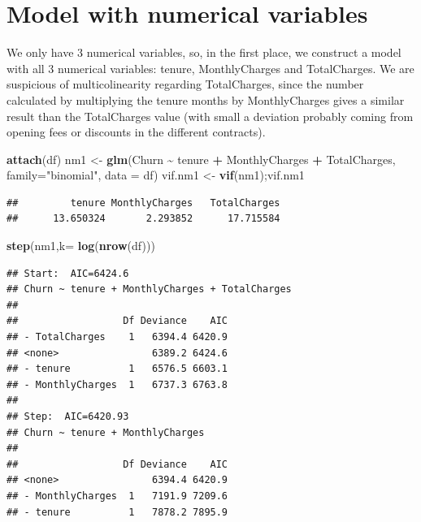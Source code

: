 \documentclass[
]{article}
\newenvironment{Shaded}{\begin{snugshade}}{\end{snugshade}}
\newcommand{\AttributeTok}[1]{\textcolor[rgb]{0.13,0.29,0.53}{#1}}
\newcommand{\FunctionTok}[1]{\textcolor[rgb]{0.13,0.29,0.53}{\textbf{#1}}}
\newcommand{\NormalTok}[1]{#1}
\newcommand{\OtherTok}[1]{\textcolor[rgb]{0.56,0.35,0.01}{#1}}
\newcommand{\SpecialCharTok}[1]{\textcolor[rgb]{0.81,0.36,0.00}{\textbf{#1}}}
\newcommand{\StringTok}[1]{\textcolor[rgb]{0.31,0.60,0.02}{#1}}
\begin{document}
\hypertarget{model-with-numerical-variables}{%
\section{Model with numerical
variables}\label{model-with-numerical-variables}}

We only have 3 numerical variables, so, in the first place, we construct
a model with all 3 numerical variables: tenure, MonthlyCharges and
TotalCharges. We are suspicious of multicolinearity regarding
TotalCharges, since the number calculated by multiplying the tenure
months by MonthlyCharges gives a similar result than the TotalCharges
value (with small a deviation probably coming from opening fees or
discounts in the different contracts).

\begin{Shaded}
\begin{Highlighting}[]
\FunctionTok{attach}\NormalTok{(df)}
\NormalTok{nm1 }\OtherTok{\textless{}{-}} \FunctionTok{glm}\NormalTok{(Churn }\SpecialCharTok{\textasciitilde{}}\NormalTok{ tenure }\SpecialCharTok{+}\NormalTok{ MonthlyCharges }\SpecialCharTok{+}\NormalTok{ TotalCharges, }\AttributeTok{family=}\StringTok{"binomial"}\NormalTok{, }\AttributeTok{data =}\NormalTok{ df)}
\NormalTok{vif.nm1 }\OtherTok{\textless{}{-}} \FunctionTok{vif}\NormalTok{(nm1);vif.nm1}
\end{Highlighting}
\end{Shaded}

\begin{verbatim}
##         tenure MonthlyCharges   TotalCharges 
##      13.650324       2.293852      17.715584
\end{verbatim}

\begin{Shaded}
\begin{Highlighting}[]
\FunctionTok{step}\NormalTok{(nm1,}\AttributeTok{k=} \FunctionTok{log}\NormalTok{(}\FunctionTok{nrow}\NormalTok{(df))) }
\end{Highlighting}
\end{Shaded}

\begin{verbatim}
## Start:  AIC=6424.6
## Churn ~ tenure + MonthlyCharges + TotalCharges
## 
##                  Df Deviance    AIC
## - TotalCharges    1   6394.4 6420.9
## <none>                6389.2 6424.6
## - tenure          1   6576.5 6603.1
## - MonthlyCharges  1   6737.3 6763.8
## 
## Step:  AIC=6420.93
## Churn ~ tenure + MonthlyCharges
## 
##                  Df Deviance    AIC
## <none>                6394.4 6420.9
## - MonthlyCharges  1   7191.9 7209.6
## - tenure          1   7878.2 7895.9
\end{verbatim}
\end{document}
